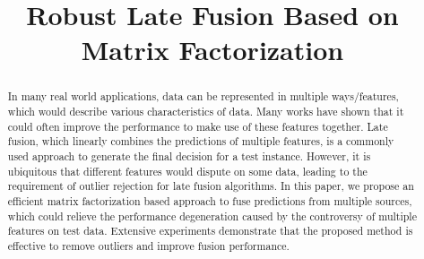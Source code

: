 \documentclass[letterpaper]{article}
\begin{document}
%



\title{Robust Late Fusion Based on Matrix Factorization}




\maketitle



\begin{abstract}
In many real world applications, data can be represented in multiple ways/features, which would describe various characteristics of data.
Many works have shown that it could often improve the performance to make use of these features together.
Late fusion, which linearly combines the predictions of multiple features, is a commonly used approach to generate the final decision for a test instance.
However, it is ubiquitous that different features would dispute on some data, leading to the requirement of outlier rejection for late fusion algorithms.
In this paper, we propose an efficient matrix factorization based approach to fuse predictions from multiple sources, which could
relieve the performance degeneration caused by the controversy of multiple features on test data.
Extensive experiments demonstrate that the proposed method is effective to remove outliers and improve fusion performance.

\end{abstract}
\end{document}

